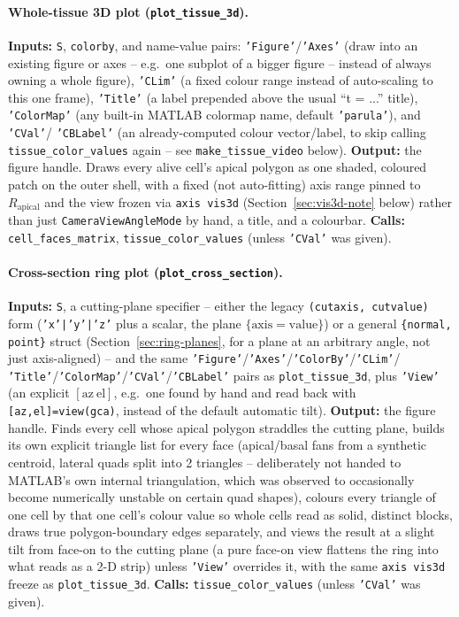 \documentclass[11pt,a4paper]{report}
\begin{document}
\paragraph{Whole-tissue 3D plot (\texttt{plot\_tissue\_3d}).}
\textbf{Inputs:} \texttt{S}, \texttt{colorby}, and name-value pairs:
\texttt{'Figure'}/\texttt{'Axes'} (draw into an existing figure or axes
-- e.g.\ one subplot of a bigger figure -- instead of always owning a
whole figure), \texttt{'CLim'} (a fixed colour range instead of
auto-scaling to this one frame), \texttt{'Title'} (a label prepended
above the usual ``t = ...'' title), \texttt{'ColorMap'} (any built-in
MATLAB colormap name, default \texttt{'parula'}), and \texttt{'CVal'}/
\texttt{'CBLabel'} (an already-computed colour vector/label, to skip
calling \texttt{tissue\_color\_values} again -- see
\texttt{make\_tissue\_video} below). \textbf{Output:} the figure
handle. Draws every alive cell's apical polygon as one shaded,
coloured patch on the outer shell, with a fixed (not auto-fitting)
axis range pinned to $R_{\mathrm{apical}}$ and the view frozen via
\texttt{axis vis3d} (Section~\ref{sec:vis3d-note} below) rather than
just \texttt{CameraViewAngleMode} by hand, a title, and a colourbar.
\textbf{Calls:} \texttt{cell\_faces\_matrix}, \texttt{tissue\_color\_values}
(unless \texttt{'CVal'} was given).
\paragraph{Cross-section ring plot (\texttt{plot\_cross\_section}).}
\textbf{Inputs:} \texttt{S}, a cutting-plane specifier -- either the
legacy \texttt{(cutaxis, cutvalue)} form (\texttt{'x'|'y'|'z'} plus a
scalar, the plane $\{\text{axis}=\text{value}\}$) or a general
\texttt{\{normal, point\}} struct (Section~\ref{sec:ring-planes}, for a
plane at an arbitrary angle, not just axis-aligned) -- and the same
\texttt{'Figure'}/\texttt{'Axes'}/\texttt{'ColorBy'}/\texttt{'CLim'}/
\texttt{'Title'}/\texttt{'ColorMap'}/\texttt{'CVal'}/\texttt{'CBLabel'}
pairs as \texttt{plot\_tissue\_3d}, plus \texttt{'View'} (an explicit
$[\mathrm{az}\ \mathrm{el}]$, e.g.\ one found by hand and read back
with \texttt{[az,el]=view(gca)}, instead of the default automatic
tilt). \textbf{Output:} the figure handle. Finds every cell whose
apical polygon straddles the cutting plane, builds its own explicit
triangle list for every face (apical/basal fans from a synthetic
centroid, lateral quads split into 2 triangles -- deliberately not
handed to MATLAB's own internal triangulation, which was observed to
occasionally become numerically unstable on certain quad shapes),
colours every triangle of one cell by that one cell's colour value so
whole cells read as solid, distinct blocks, draws true polygon-boundary
edges separately, and views the result at a slight tilt from face-on
to the cutting plane (a pure face-on view flattens the ring into what
reads as a 2-D strip) unless \texttt{'View'} overrides it, with the
same \texttt{axis vis3d} freeze as \texttt{plot\_tissue\_3d}.
\textbf{Calls:} \texttt{tissue\_color\_values} (unless \texttt{'CVal'}
was given).
\end{document}
